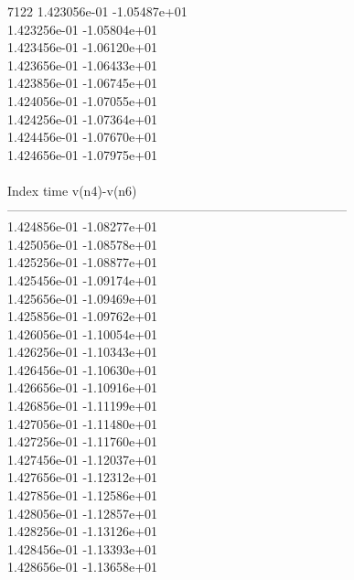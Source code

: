 7122	1.423056e-01	-1.05487e+01	\\ 	1.423256e-01	-1.05804e+01	\\ 	1.423456e-01	-1.06120e+01	\\ 	1.423656e-01	-1.06433e+01	\\ 	1.423856e-01	-1.06745e+01	\\ 	1.424056e-01	-1.07055e+01	\\ 	1.424256e-01	-1.07364e+01	\\ 	1.424456e-01	-1.07670e+01	\\ 	1.424656e-01	-1.07975e+01	\\ \hline
\\ \hline
Index   time            v(n4)-v(n6)     \\ \hline
--------------------------------------------------------------------------------\\ 	1.424856e-01	-1.08277e+01	\\ 	1.425056e-01	-1.08578e+01	\\ 	1.425256e-01	-1.08877e+01	\\ 	1.425456e-01	-1.09174e+01	\\ 	1.425656e-01	-1.09469e+01	\\ 	1.425856e-01	-1.09762e+01	\\ 	1.426056e-01	-1.10054e+01	\\ 	1.426256e-01	-1.10343e+01	\\ 	1.426456e-01	-1.10630e+01	\\ 	1.426656e-01	-1.10916e+01	\\ 	1.426856e-01	-1.11199e+01	\\ 	1.427056e-01	-1.11480e+01	\\ 	1.427256e-01	-1.11760e+01	\\ 	1.427456e-01	-1.12037e+01	\\ 	1.427656e-01	-1.12312e+01	\\ 	1.427856e-01	-1.12586e+01	\\ 	1.428056e-01	-1.12857e+01	\\ 	1.428256e-01	-1.13126e+01	\\ 	1.428456e-01	-1.13393e+01	\\ 	1.428656e-01	-1.13658e+01	\\ \hline
